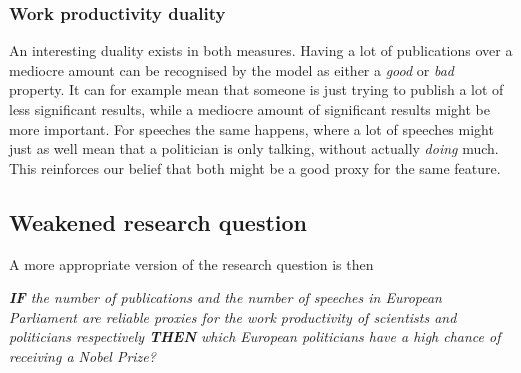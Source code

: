 \subsubsection{Work productivity duality}
An interesting duality exists in both measures. Having a lot of publications over a mediocre amount can be recognised by the model as either a \emph{good} or \emph{bad} property. It can for example mean that someone is just trying to publish a lot of less significant results, while a mediocre amount of significant results might be more important. For speeches the same happens, where a lot of speeches might just as well mean that a politician is only talking, without actually \emph{doing} much. This reinforces our belief that both might be a good proxy for the same feature.

\subsection{Weakened research question}
A more appropriate version of the research question is then
\begin{center}
	\emph{\textbf{\textsc{IF}} the number of publications and the number of speeches in European Parliament are reliable proxies for the work productivity of scientists and politicians respectively \textbf{\textsc{THEN}} which European politicians have a high chance of receiving a Nobel Prize?}
\end{center}
